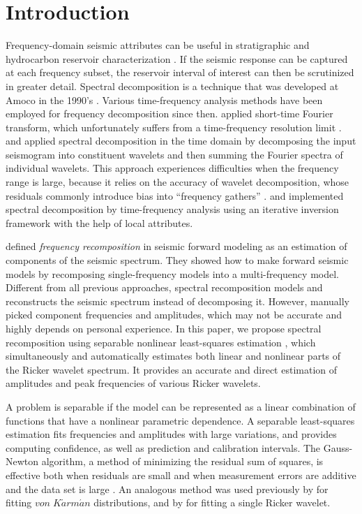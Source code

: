 \section{Introduction}
Frequency-domain seismic attributes can be useful in stratigraphic and hydrocarbon reservoir characterization \cite[]{Castagna,Li}. If the seismic response can be captured at each frequency subset, the reservoir interval of interest can then be scrutinized in greater detail. Spectral decomposition is a technique that was developed at Amoco in the 1990's \cite[]{Partyka}. Various time-frequency analysis methods have been employed for frequency decomposition since then. \cite{Dilay} applied short-time Fourier transform, which unfortunately suffers from a time-frequency resolution limit \cite[]{Chakraborty}. \cite{Liu} and \cite{Chen} applied spectral decomposition in the time domain by decomposing the input seismogram into constituent wavelets and then summing the Fourier spectra of individual wavelets. This approach experiences difficulties when the frequency range is large, because it relies on the accuracy of wavelet decomposition, whose residuals commonly introduce bias into ``frequency gathers'' \cite[]{Chen}. \cite{Fomel} and \cite{Liu} implemented spectral decomposition by time-frequency analysis using an iterative inversion framework with the help of local attributes.

\cite{Tomasso} defined \emph{frequency recomposition} in seismic forward modeling as an estimation of components of the seismic spectrum. They showed how to make forward seismic models by recomposing single-frequency models into a multi-frequency model. Different from all previous approaches, spectral recomposition models and reconstructs the seismic spectrum instead of decomposing it. However, \cite{Tomasso} manually picked component frequencies and amplitudes, which may not be accurate and highly depends on personal experience. In this paper, we propose spectral recomposition using separable nonlinear least-squares estimation \cite[]{Golub}, which simultaneously and automatically estimates both linear and nonlinear parts of the Ricker wavelet spectrum. It provides an accurate and direct estimation of amplitudes and peak frequencies of various Ricker wavelets. 

A problem is separable if the model can be represented as a linear combination of functions that have a nonlinear parametric dependence. A separable least-squares estimation fits frequencies and amplitudes with large variations, and provides computing confidence, as well as prediction and calibration intervals. The Gauss-Newton algorithm, a method of minimizing the residual sum of squares, is effective both when residuals are small and when measurement errors are additive and the data set is large \cite[]{Osborne}. An analogous method was used previously by \cite{Browaeys} for fitting $von\;K\acute{a}rm\acute{a}n$ distributions, and by \cite{Liu2} for fitting a single Ricker wavelet.

